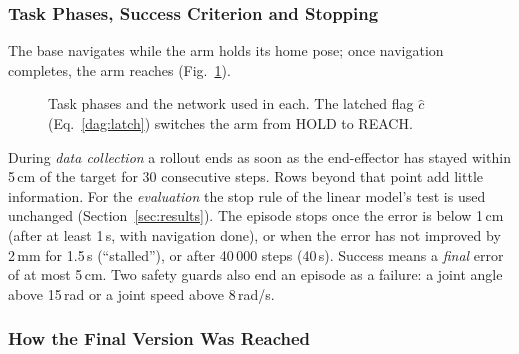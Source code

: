\documentclass[conference]{IEEEtran}
\begin{document}
\subsubsection{Task Phases, Success Criterion and Stopping}
\label{dag:task}

The base navigates while the arm holds its home pose; once navigation completes, the arm reaches (Fig.~\ref{dag:phases}).

\begin{figure}[t]
\centering
{}
\caption{Task phases and the network used in each. The latched flag $\hat c$ (Eq.~\eqref{dag:latch}) switches the arm from HOLD to REACH.}
\label{dag:phases}
\end{figure}

During \emph{data collection} a rollout ends as soon as the end-effector has stayed within 5\,cm of the target for 30 consecutive steps. Rows beyond that point add little information. For the \emph{evaluation} the stop rule of the linear model's test is used unchanged (Section~\ref{sec:results}). The episode stops once the error is below 1\,cm (after at least 1\,s, with navigation done), or when the error has not improved by 2\,mm for 1.5\,s (``stalled''), or after 40\,000 steps (40\,s). Success means a \emph{final} error of at most 5\,cm. Two safety guards also end an episode as a failure: a joint angle above 15\,rad or a joint speed above 8\,rad/s.

\subsubsection{How the Final Version Was Reached}
\label{dag:history}
\end{document}
